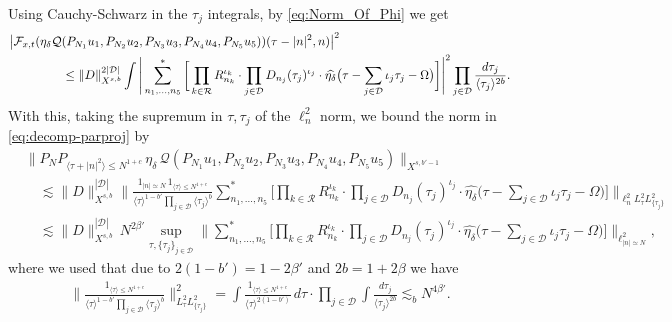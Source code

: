 \documentclass[11pt, xcolor = dvipsnames,reqno
]{amsart}
\theoremstyle{definition}
\theoremstyle{remark}
\begin{document}
Using Cauchy-Schwarz in the $\tau_j$ integrals, by \eqref{eq:Norm_Of_Phi} we get
\begin{align}
    & 
    \big| \mathcal F_{x,t}
    ( 
    \eta_\delta  \mathcal{Q} (P_{N_1}u_1, P_{N_2}u_2, P_{N_3}u_3, P_{N_4}u_4, P_{N_5}u_5)
    )
    (\tau - |n|^2,n) \big|^2 \\
    & \hspace{1.5cm}
    \leq 
    \lVert D \rVert_{X^{s,b}}^{2|\mathcal D|}
    \int 
    \Bigg|
    \sum_{n_1, \ldots, n_5}^*
    \bigg[
    \prod_{k \in \mathcal R} R_{n_k}^{\iota_k} \cdot 
    \prod_{j \in \mathcal D}  D_{n_j}(\tau_j)^{\iota_j} \cdot
    \widehat{\eta_\delta}
    \big(
    \tau - \sum_{j \in \mathcal D} \iota_j \tau_j  - \Omega
    \big)
    \bigg]
    \Bigg|^2
    \prod_{j \in \mathcal D} \frac{d\tau_j}{\langle \tau_j \rangle^{2b}}.
\end{align}
With this, taking the supremum in $\tau, \tau_j$ of the $\ell^2_n$ norm,  
we bound the norm in \eqref{eq:decomp-parproj} by
\begin{align}\label{eq:Last_To_Estimate}
    & \big\lVert P_N  P_{\langle \tau + |n|^2 \rangle \leq N^{1+c}} 
    \, \eta_\delta \, 
     \mathcal{Q} (P_{N_1}u_1, P_{N_2}u_2, P_{N_3}u_3, P_{N_4}u_4, P_{N_5}u_5) \big\rVert_{X^{s,b'-1}} \nonumber \\
    & \quad \lesssim
    \|D\|_{X^{s,b}}^{|\mathcal{D}|}
    \bigg \lVert \frac{ \mathrm1_{|n| \simeq N } \,  \mathrm1_{\langle \tau \rangle \leq N^{1+c}} }{\langle \tau \rangle^{1-b'} \prod_{j \in \mathcal D} \langle \tau_j \rangle^b} \sum_{n_1, \ldots, n_5}^*
    \bigg[
    \prod_{k \in \mathcal R} R_{n_k}^{\iota_k} \cdot 
    \prod_{j \in \mathcal D}  D_{n_j}(\tau_j)^{\iota_j} \cdot
    \widehat{\eta_\delta}
    \big(
    \tau - \sum_{j \in \mathcal D} \iota_j \tau_j  - \Omega
    \big)
    \bigg] 
    \bigg\rVert_{\ell^2_n L^2_\tau L^2_{\{\tau_j\}}} \nonumber \\
    & \quad \lesssim
    \|D\|_{X^{s,b}}^{|\mathcal{D}|} \, N^{ 2\beta'} \sup_{\tau, \{\tau_j\}_{j \in \mathcal D}} \bigg\lVert \sum_{n_1, \ldots, n_5}^*
    \bigg[
    \prod_{k \in \mathcal R} R_{n_k}^{\iota_k} \cdot 
    \prod_{j \in \mathcal D}  D_{n_j}(\tau_j)^{\iota_j} \cdot
    \widehat{\eta_\delta}
    \big(
    \tau - \sum_{j \in \mathcal D} \iota_j \tau_j  - \Omega
    \big)
    \bigg] \bigg\rVert_{\ell^2_{|n|\simeq N}} ,
\end{align}
where we used that due to $2(1-b') = 1 - 2\beta'$ and $2b = 1 + 2\beta$ we have
\begin{align}
    \bigg \lVert \frac{\mathrm1_{\langle \tau \rangle \leq N^{1+c}} }{\langle \tau \rangle^{1-b'} \prod_{j \in \mathcal D} \langle \tau_j \rangle^b}  \bigg\rVert_{ L^2_\tau L^2_{\{\tau_j\}}}^2 = 
    \int \frac{\mathrm1_{\langle \tau \rangle \leq N^{1+c}}}{\langle \tau \rangle^{2(1-b')}} \, d\tau \cdot \prod_{j\in \mathcal D} \int  \frac{d\tau_j}{\langle \tau_j \rangle^{2b}} 
    \lesssim_b N^{4\beta'}.
\end{align}
\end{document}
